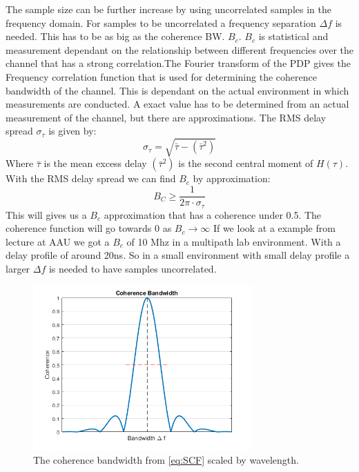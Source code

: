 The sample size can be further increase by using uncorrelated samples in the frequency domain. 
For samples to be uncorrelated a frequency separation $\Delta f$  is needed. This has to be as big as the coherence BW. $B_{c}$. $B_{c}$ is statistical and measurement dependant on the relationship between different frequencies over the channel that has a strong correlation.The Fourier transform of the PDP gives the Frequency correlation function that is used for determining the coherence bandwidth of the channel. This is dependant on the actual environment in which measurements are conducted. A exact value has to be determined from  an actual measurement of the channel, but there are approximations\citep{RayFadeHandbook}. The RMS delay spread $\sigma_{\tau}$ is given by:
\begin{equation}
\sigma_{\tau} = \sqrt{\bar{\tau} - {(\bar{\tau}^{2})}}
\end{equation}
Where $\bar{\tau}$ is the mean excess delay $(\bar{\tau}^{2})$ is 
the second central moment of $H(\tau)$. With the RMS delay spread we can find $B_c$ by approximation:
\begin{equation}
B_C \geq \frac{1}{2\pi \cdot \sigma_{\tau}}
\label{CohBW}
\end{equation}
This will gives us a $B_c$ approximation that has a coherence under 0.5. The coherence function will go towards 0 as $B_c  \rightarrow \infty $
\citep{CohBW}
If we look at a example from lecture at AAU we got a $B_c$ of 10 Mhz in a multipath lab environment.
 With a delay profile of around 20ns. So in a small environment with small delay profile a larger $\Delta f$ is needed to have samples uncorrelated.
\citep[Chapter 18.5]{ComHandbook}

\begin{figure}[H]
\centering
\includegraphics[width=0.75\textwidth]{figures/Coh_BW.png}
\caption{The coherence bandwidth from \autoref{eq:SCF} scaled by wavelength.}
\label{bessel_wave}
\end{figure}

